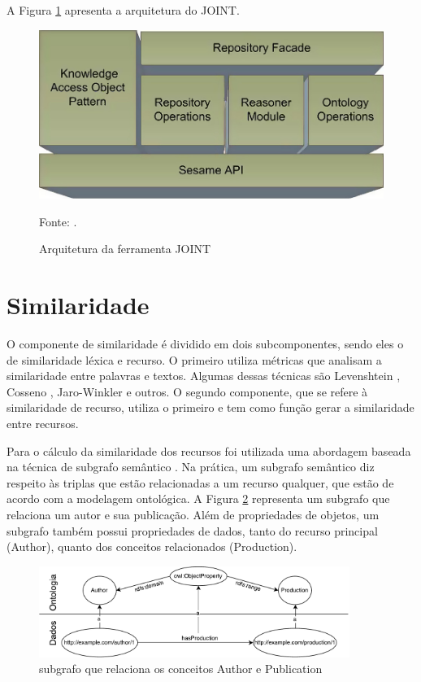 A Figura \ref{fig:joint} apresenta a arquitetura do JOINT.

\begin{figure}[!ht]
	\centering
	\includegraphics[width=1\textwidth]{./imagens/joint.png}
	\caption{Arquitetura da ferramenta JOINT}
	\footnotesize{Fonte: \cite{holanda2013joint}.}
	\label{fig:joint}
\end{figure}

\section{Similaridade}
O componente de similaridade é dividido em dois subcomponentes, sendo eles o de similaridade léxica e recurso. O primeiro utiliza métricas que analisam a similaridade entre palavras e textos. Algumas dessas técnicas são Levenshtein \cite{levenshtein1966binary}, Cosseno \cite{singhal2001modern}, Jaro-Winkler \cite{winkler1990string} e outros. O segundo componente, que se refere à similaridade de recurso, utiliza o primeiro e tem como função gerar a similaridade entre recursos.

Para o cálculo da similaridade dos recursos foi utilizada uma abordagem baseada na técnica de subgrafo semântico \cite{wang2008lily}. Na prática, um subgrafo semântico diz respeito às triplas que estão relacionadas a um recurso qualquer, que estão de acordo com a modelagem ontológica. A Figura \ref{fig:subgrafo} representa um subgrafo que relaciona um autor e sua publicação. Além de propriedades de objetos, um subgrafo também possui propriedades de dados, tanto do recurso principal (Author), quanto dos conceitos relacionados (Production). %

\begin{figure}[!ht]
	\centering
	\includegraphics[width=0.9\textwidth]{./imagens/subgrafo_semantico.pdf}
    \caption{subgrafo que relaciona os conceitos Author e Publication}
	\label{fig:subgrafo}
\end{figure}

